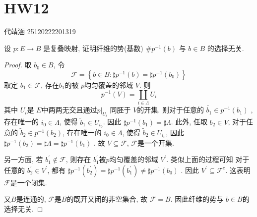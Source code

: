 \documentclass[../main.tex]{subfiles}
\begin{document}
\ifSubfilesClassLoaded{

    
    \setcounter{chapter}{11}
}{}

\chapter{ HW12 }
代靖涵 25120222201319
\begin{exercise}{}{}
设 $p: E \to B$ 是复叠映射, 证明纤维的势(基数) $\# p^{-1}(b)$ 与 $b \in B$ 的选择无关.
\end{exercise}

\begin{proof}
    取 \(  b_0\in B  \), 令 \[
    \mathcal{F}= \left\{ b\in B: \sharp p^{-1} \left( b \right)= \sharp p^{-1} \left( b_0 \right)   \right\}
    \] 取定 \(  b_1\in \mathcal{F}  \), 存在\(  b_1  \)的被 \(  p  \)均匀覆盖的邻域 \(  V  \). 则 \[
    p^{-1} \left( V \right)= \coprod _{i \in  \Lambda }U_{i} 
    \] 其中 \(  U_{i}  \)是 \(  E  \)中两两无交且通过\(  p|_{U_{i}}  \) 同胚于 \(  V  \)的开集.   则对于任意的 \(  \tilde{b_1}\in p^{-1} \left( b_1 \right)   \) , 存在唯一的 \(  i_0\in  \Lambda   \), 使得 \(  \tilde{b}_{1}\in U_{i_0}  \).  因此 \(  \sharp p^{-1} \left( b_1 \right)= \sharp  \Lambda    \). 此外, 任取 \(  b_2\in V  \),   对于任意的 \(  \tilde{b}_{2}\in p^{-1} \left( b_2 \right)   \), 存在唯一的 \(  i_0\in  \Lambda   \), 使得 \(  \tilde{b}_{2}\in U_{i_0}  \), 因此 \(  \sharp p^{-1} \left( b_2 \right)= \sharp  \Lambda = \sharp p^{-1} \left( b_1 \right)    \)    . 故 \(  V\subseteq \mathcal{F}  \), \(  \mathcal{F}  \)是一个开集.  
    
    
    另一方面, 若 \(  b_1^{\prime} \not \in \mathcal{F}  \), 则存在 \(  b_1^{\prime}   \)被\(  p  \)均匀覆盖的邻域 \(  V^{\prime}   \). 类似上面的过程可知 对于任意的 \(  b_2^{\prime} \in V^{\prime}   \), 都有 \(  \sharp p^{-1} \left( b_2^{\prime}  \right)= \sharp p^{-1} \left( b_1^{\prime}  \right)\neq \sharp p^{-1} \left( b_0\right)     \)     . 因此 \( V^{\prime} \subseteq   \mathcal{F} ^{c} \). 这表明 \(  \mathcal{F}  \)是一个闭集.
    
    又\(  B  \)是连通的,  \(  \mathcal{F}  \)是\(  B  \)的既开又闭的非空集合, 故 \(  \mathcal{F}= B  \). 因此纤维的势与 \(  b\in B  \)的选择无关.  
\end{proof}
\end{document}
